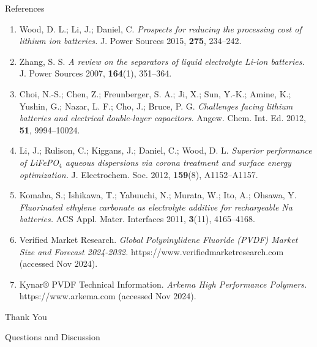 \documentclass[aspectratio=169]{beamer}
\begin{document}
\begin{frame}[allowframebreaks]{References}
\begin{enumerate}
        \item Wood, D. L.; Li, J.; Daniel, C. \textit{Prospects for reducing the processing cost of lithium ion batteries.} J. Power Sources 2015, \textbf{275}, 234–242.
        
        \item Zhang, S. S. \textit{A review on the separators of liquid electrolyte Li-ion batteries.} J. Power Sources 2007, \textbf{164}(1), 351–364.
        
        \item Choi, N.-S.; Chen, Z.; Freunberger, S. A.; Ji, X.; Sun, Y.-K.; Amine, K.; Yushin, G.; Nazar, L. F.; Cho, J.; Bruce, P. G. \textit{Challenges facing lithium batteries and electrical double-layer capacitors.} Angew. Chem. Int. Ed. 2012, \textbf{51}, 9994–10024.
        
        \item Li, J.; Rulison, C.; Kiggans, J.; Daniel, C.; Wood, D. L. \textit{Superior performance of LiFePO$_4$ aqueous dispersions via corona treatment and surface energy optimization.} J. Electrochem. Soc. 2012, \textbf{159}(8), A1152–A1157.
        
        \item Komaba, S.; Ishikawa, T.; Yabuuchi, N.; Murata, W.; Ito, A.; Ohsawa, Y. \textit{Fluorinated ethylene carbonate as electrolyte additive for rechargeable Na batteries.} ACS Appl. Mater. Interfaces 2011, \textbf{3}(11), 4165–4168.
        
        \item Verified Market Research. \textit{Global Polyvinylidene Fluoride (PVDF) Market Size and Forecast 2024-2032.} https://www.verifiedmarketresearch.com (accessed Nov 2024).
        
        \item Kynar® PVDF Technical Information. \textit{Arkema High Performance Polymers.} https://www.arkema.com (accessed Nov 2024).
    \end{enumerate}
\end{frame}

\begin{frame}[plain]
    \vfill
    \begin{center}
        {\Huge \textcolor{DarkNavy}{Thank You}}
        
        \vspace{1cm}
        
        {\Large Questions and Discussion}
        
        \vspace{1cm}
    \end{center}
    \vfill
\end{frame}
\end{document}
